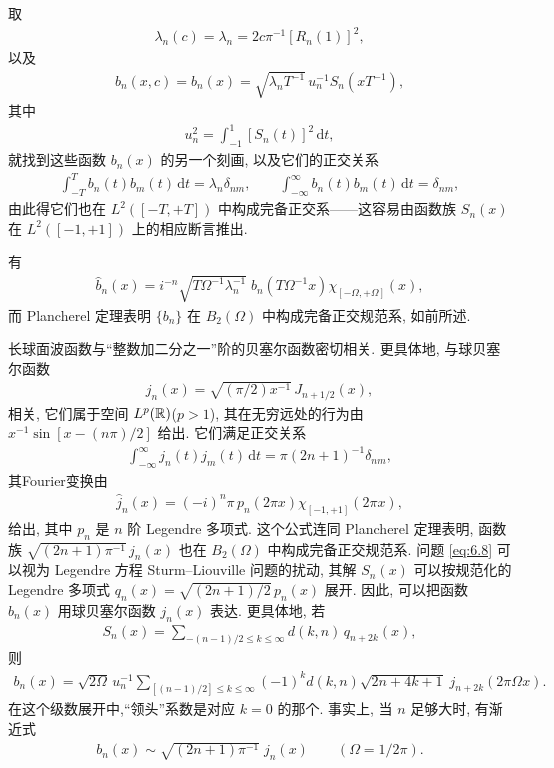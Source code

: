 取
\begin{align*}
  \lambda_{n}(c)=\lambda_{n}=2c\pi^{-1}\left[R_{n}(1)\right]^{2},
\end{align*}
以及
\begin{align*}
  b_{n}(x,c)=b_{n}(x)=\sqrt{\lambda_{n}T^{-1}}\,u_{n}^{-1}S_{n}(xT^{-1}),
\end{align*}
其中
\begin{align*}
  u_{n}^{2}=\int_{-1}^{1}[S_{n}(t)]^{2}\,\mathrm{d}t,
\end{align*}
就找到这些函数 $b_{n}(x)$ 的另一个刻画, 以及它们的正交关系
\begin{align*}
  \int_{-T}^{T}b_{n}(t)b_{m}(t)\,\mathrm{d}t=\lambda_{n}\delta_{nm},\qquad
  \int_{-\infty}^{\infty}b_{n}(t)b_{m}(t)\,\mathrm{d}t=\delta_{nm},
\end{align*}
由此得它们也在 $L^2([-T,+T])$ 中构成完备正交系——这容易由函数族 $S_n(x)$ 在 $L^2([-1,+1])$ 上的相应断言推出.

有
\begin{align*}
  \widehat{b}_{n}(x)=i^{-n}\sqrt{T\Omega^{-1}\lambda_{n}^{-1}}\;b_{n}\left(T\Omega^{-1}x\right)\chi_{\left[-\Omega,+\Omega\right]}(x),
\end{align*}
而 Plancherel 定理表明 $\{b_n\}$ 在 $B_2(\Omega)$ 中构成完备正交规范系, 如前所述.

长球面波函数与``整数加二分之一''阶的贝塞尔函数密切相关. 更具体地, 与球贝塞尔函数
\begin{align*}
  j_{n}(x)=\sqrt{(\pi/2)x^{-1}}\,J_{n+1/2}(x),
\end{align*}
相关, 它们属于空间 $L^p(\mathbb{R})$($p > 1$), 其在无穷远处的行为由 $x^{-1}\sin[x - (n\pi)/2]$ 给出. 它们满足正交关系
\begin{align*}
  \int_{-\infty}^{\infty}j_{n}(t)j_{m}(t)\,\mathrm{d}t=\pi(2n+1)^{-1}\delta_{nm},
\end{align*}
其Fourier变换由
\begin{align*}
  \widehat{j}_{n}(x)=(-i)^{n}\pi\,p_{n}(2\pi x)\chi_{\left[-1,+1\right]}(2\pi x),
\end{align*}
给出, 其中 $p_n$ 是 $n$ 阶 Legendre 多项式. 这个公式连同 Plancherel 定理表明, 函数族 $\sqrt{(2n+1)\pi^{-1}}\,j_n(x)$ 也在 $B_2(\Omega)$ 中构成完备正交规范系. 问题 \eqref{eq:6.8} 可以视为 Legendre 方程 Sturm--Liouville 问题的扰动, 其解 $S_n(x)$ 可以按规范化的 Legendre 多项式 $q_n(x) = \sqrt{(2n+1)/2}\,p_n(x)$ 展开. 因此, 可以把函数 $b_n(x)$ 用球贝塞尔函数 $j_n(x)$ 表达. 更具体地, 若
\begin{align*}
  S_{n}(x)=\sum_{-\left(n-1\right)/2\leq k\leq\infty}d(k,n)\,q_{n+2k}(x),
\end{align*}
则
\begin{align*}
  b_{n}(x)=\sqrt{2\Omega}\,u_{n}^{-1}
  \sum_{[(n-1)/2]\leq k\leq\infty}(-1)^{k}d(k,n)\sqrt{2n+4k+1}\;j_{n+2k}(2\pi\Omega x).
\end{align*}
在这个级数展开中,``领头''系数是对应 $k = 0$ 的那个. 事实上, 当 $n$ 足够大时, 有渐近式
\begin{align*}
  b_{n}(x)\sim\sqrt{(2n+1)\pi^{-1}}\;j_{n}(x)\qquad (\Omega=1/2\pi).
\end{align*}

